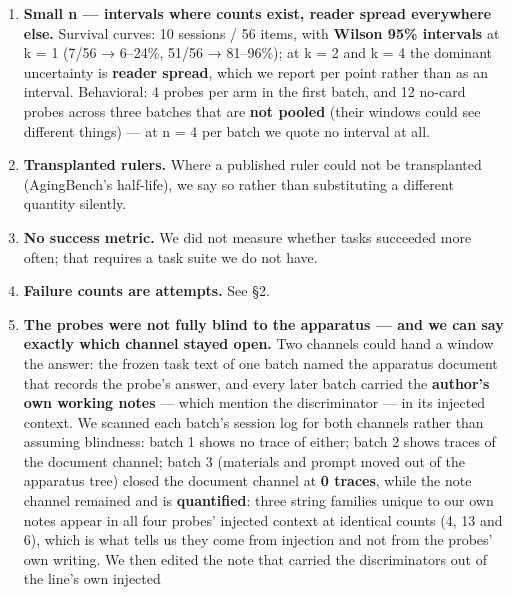 \documentclass[
]{article}
\begin{document}
\begin{enumerate}
\begin{itemize}
    judges are included. Their disagreements with the key sit
    \textbf{entirely off the two-state boundary} --- \textbf{0} cells at
    \texttt{verbatim} \ensuremath{\leftrightarrow} \texttt{gone} against
    \textbf{14 / 16 / 17} at \texttt{verbatim}
    \ensuremath{\leftrightarrow} \texttt{reworded} --- which is the same
    seam every other pass falls on.
  \end{itemize}
\item
  \textbf{Small n --- intervals where counts exist, reader spread
  everywhere else.} Survival curves: 10 sessions / 56 items, with
  \textbf{Wilson 95\% intervals} at k = 1 (7/56 → 6--24\%, 51/56 →
  81--96\%); at k = 2 and k = 4 the dominant uncertainty is
  \textbf{reader spread}, which we report per point rather than as an
  interval. Behavioral: 4 probes per arm in the first batch, and 12
  no-card probes across three batches that are \textbf{not pooled}
  (their windows could see different things) --- at n = 4 per batch we
  quote no interval at all.
\item
  \textbf{Transplanted rulers.} Where a published ruler could not be
  transplanted (AgingBench's half-life), we say so rather than
  substituting a different quantity silently.
\item
  \textbf{No success metric.} We did not measure whether tasks succeeded
  more often; that requires a task suite we do not have.
\item
  \textbf{Failure counts are attempts.} See §2.
\item
  \textbf{The probes were not fully blind to the apparatus --- and we
  can say exactly which channel stayed open.} Two channels could hand a
  window the answer: the frozen task text of one batch named the
  apparatus document that records the probe's answer, and every later
  batch carried the \textbf{author's own working notes} --- which
  mention the discriminator --- in its injected context. We scanned each
  batch's session log for both channels rather than assuming blindness:
  batch 1 shows no trace of either; batch 2 shows traces of the document
  channel; batch 3 (materials and prompt moved out of the apparatus
  tree) closed the document channel at \textbf{0 traces}, while the note
  channel remained and is \textbf{quantified}: three string families
  unique to our own notes appear in all four probes' injected context at
  identical counts (4, 13 and 6), which is what tells us they come from
  injection and not from the probes' own writing. We then edited the
  note that carried the discriminators out of the line's own injected

\end{enumerate}
\end{document}
